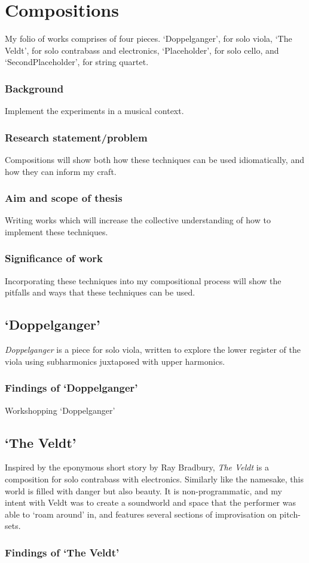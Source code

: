 
\chapter{Compositions}
My folio of works comprises of four pieces. `Doppelganger', for solo viola, `The Veldt', for solo contrabass and electronics, `Placeholder', for solo cello, and `SecondPlaceholder', for string quartet.
\subsection{Background}
Implement the experiments in a musical context.
\subsection{Research statement/problem}
Compositions will show both how these techniques can be used idiomatically, and how they can inform my craft.
\subsection{Aim and scope of thesis}
Writing works which will increase the collective understanding of how to implement these techniques.
\subsection{Significance of work}
Incorporating these techniques into my compositional process will show the pitfalls and ways that these techniques can be used.
\section{`Doppelganger'}
\emph{Doppelganger} is a piece for solo viola, written to explore the lower register of the viola using subharmonics juxtaposed with upper harmonics. 

\subsection{Findings of `Doppelganger'}
Workshopping `Doppelganger' \lipsum[3]

\section{`The Veldt'}
Inspired by the eponymous short story by Ray Bradbury, \textit{The Veldt} is a composition for solo contrabass with electronics. Similarly like the namesake, this world is filled with danger but also beauty. It is non-programmatic, and my intent with Veldt was to create a soundworld and space that the performer was able to `roam around' in, and features several sections of improvisation on pitch-sets. \lipsum[1]

\subsection{Findings of `The Veldt'}
\lipsum[3]